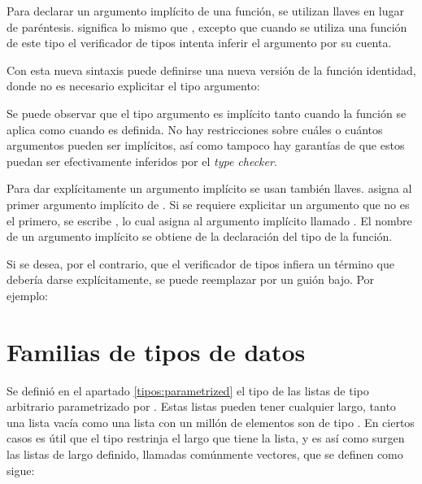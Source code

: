 Para declarar un argumento implícito de una función, se utilizan llaves en lugar de paréntesis. \AgdaSymbol{\{} \AgdaSymbol{:} \AgdaSymbol{\}} \AgdaSymbol{$\rightarrow$}  significa lo mismo que \AgdaSymbol{(} \AgdaSymbol{:} \AgdaSymbol{)} \AgdaSymbol{$\rightarrow$} , excepto que cuando se utiliza una función de este tipo el verificador de tipos intenta inferir el argumento por su cuenta. 

Con esta nueva sintaxis puede definirse una nueva versión de la función identidad, donde no es necesario explicitar el tipo argumento:


Se puede observar que el tipo argumento es implícito tanto cuando la función se aplica como cuando es definida. No hay restricciones sobre cuáles o cuántos argumentos pueden ser implícitos, así como tampoco hay garantías de que estos puedan ser efectivamente inferidos por el \textit{type checker}. 

Para dar explícitamente un argumento implícito se usan también llaves.  \AgdaSymbol{\{}\AgdaSymbol{\}} asigna  al primer argumento implícito de . Si se requiere explicitar un argumento que no es el primero, se escribe  \AgdaSymbol{\{} \AgdaSymbol{=} \AgdaSymbol{\}}, lo cual asigna  al argumento implícito llamado . El nombre de un argumento implícito se obtiene de la declaración del tipo de la función. 

Si se desea, por el contrario, que el verificador de tipos infiera un término que debería darse explícitamente, se puede reemplazar por un guión bajo. Por ejemplo:


\section{Familias de tipos de datos}\label{agda:family}

Se definió en el apartado \ref{tipos:parametrized} el tipo de las listas de tipo arbitrario parametrizado por . Estas listas pueden tener cualquier largo, tanto una lista vacía como una lista con un millón de elementos son de tipo  . En ciertos casos es útil que el tipo restrinja el largo que tiene la lista, y es así como surgen las listas de largo definido, llamadas comúnmente vectores, que se definen como sigue:


